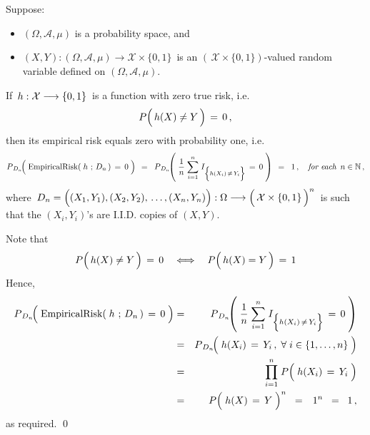 
\vskip 1.0cm
\begin{lemma}
\mbox{}\vskip 0.1cm
\noindent
Suppose:
\begin{itemize}
\item
	$(\Omega,\mathcal{A},\mu)$ is a probability space, and
\item
	$(X,Y) : (\Omega,\mathcal{A},\mu) \longrightarrow \mathcal{X}\times\{0,1\}$\,
	is an $\left(\,\mathcal{X}\times\{0,1\}\right)$-valued random variable
	defined on $(\Omega,\mathcal{A},\mu)$.
\end{itemize}
If \,$h : \mathcal{X} \overset{{\color{white}-}}{\longrightarrow} \{0,1\}$\,
is a function with zero true risk, i.e.
\begin{equation*}
P\!\left(\,h(X) \overset{{\color{white}.}}{\neq} Y \,\right) \,=\, 0\,,
\end{equation*}
then its empirical risk equals zero with probability one, i.e.
\begin{equation*}
P_{\,D_{n}}\!\!\left(\;
	\textnormal{EmpiricalRisk}(\;h\,\overset{{\color{white}-}}{;}\,D_{n}\,) \,=\, 0
	\;\right)
\;\, = \;\;
P_{\,D_{n}}\!\!\left(\;
	\dfrac{1}{n}\;\overset{n}{\underset{i=1}{\sum}}\;
	I_{\left\{h(X_{i}) \,\overset{{\color{white}.}}{\neq}\, Y_{i}\right\}} \,=\, 0
	\;\right)
\;\, = \;\;
	1\,,
\quad
\textit{for each \,$n\in\N$}\,,
\end{equation*}
where
\,$D_{n} = \left((X_{1},Y_{1}),(X_{2},Y_{2}),\,\overset{{\color{white}\vert}}{\ldots}\,,(X_{n},Y_{n})\right)
	: \Omega \longrightarrow
	\left(\,\mathcal{X}\overset{{\color{white}.}}{\times}\{0,1\}\,\right)^{n}$\,
is such that the $(X_{i},Y_{i})$'s are I.I.D. copies of $(X,Y)$.
\end{lemma}
\proof
Note that
\begin{equation*}
P\!\left(\,h(X) \overset{{\color{white}.}}{\neq} Y \,\right) \,=\, 0
\quad\Longleftrightarrow\quad
P\!\left(\,h(X) \overset{{\color{white}-}}{=} Y \,\right) \,=\, 1
\end{equation*}
Hence,
\begin{eqnarray*}
P_{\,D_{n}}\!\!\left(\;
	\textnormal{EmpiricalRisk}(\;h\,\overset{{\color{white}-}}{;}\,D_{n}\,) \,=\, 0
	\;\right)
& = &
	P_{\,D_{n}}\!\!\left(\;
		\dfrac{1}{n}\;\overset{n}{\underset{i=1}{\sum}}\;
		I_{\left\{h(X_{i}) \,\overset{{\color{white}.}}{\neq}\, Y_{i}\right\}} \,=\, 0
		\;\right)
\\
& = &
	P_{\,D_{n}}\!\!\left(\;
		h(X_{i}) \,\overset{{\color{white}-}}{=}\, Y_{i}\,,\;\forall\;i\in\{1,\ldots,n\}
		\;\right)
\\
& = &
	\overset{n}{\underset{i=1}{\prod}}\;
	P\!\left(\; h(X_{i}) \,\overset{{\color{white}-}}{=}\, Y_{i} \;\right)
\\
& = &
	P\!\left(\; h(X) \,\overset{{\color{white}-}}{=}\, Y \;\right)^{n}
	\;\; = \;\;\, 1^{n} \;\; = \;\; 1\,,
\end{eqnarray*}
as required.
\qed

